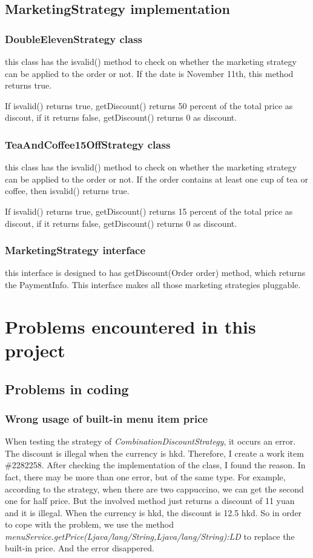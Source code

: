 \documentclass[a4paper]{report}
\begin{document}
\section{MarketingStrategy implementation}
\subsection{DoubleElevenStrategy class}
\par this class has the isvalid() method to check on whether the marketing strategy can be applied to the order or not.  If the date is November 11th, this method returns true.
\par If isvalid() returns true, getDiscount() returns 50 percent of the total price as discout, if it returns false, getDiscount() returns 0 as discount.
\subsection{TeaAndCoffee15OffStrategy class}
\par this class has the isvalid() method to check on whether the marketing strategy can be applied to the order or not. If the order contains at least one cup of tea or coffee, then isvalid() returns true.
\par If isvalid() returns true, getDiscount() returns 15 percent of the total price as discout, if it returns false, getDiscount() returns 0 as discount.
\subsection{MarketingStrategy interface}
\par this interface is designed to has getDiscount(Order order) method, which returns the PaymentInfo. This interface makes all those marketing strategies pluggable.

\chapter{Problems encountered in this project}
\section{Problems in coding}
\subsection{Wrong usage of built-in menu item price}
\par When testing the strategy of \emph{CombinationDiscountStrategy}, it occurs an error. The discount is illegal when the currency is hkd. Therefore, I create a work item \#2282258. After checking the implementation of the class, I found the reason. In fact, there may be more than one error, but of the same type. For example, according to the strategy, when there are two cappuccino, we can get the second one for half price. But the involved method just returns a discount of 11 yuan and it is illegal. When the currency is hkd, the discount is 12.5 hkd. So in order to cope with the problem, we use the method \emph{menuService.getPrice(Ljava/lang/String,Ljava/lang/String):LD} to replace the built-in price. And the error disappered.
\end{document}
